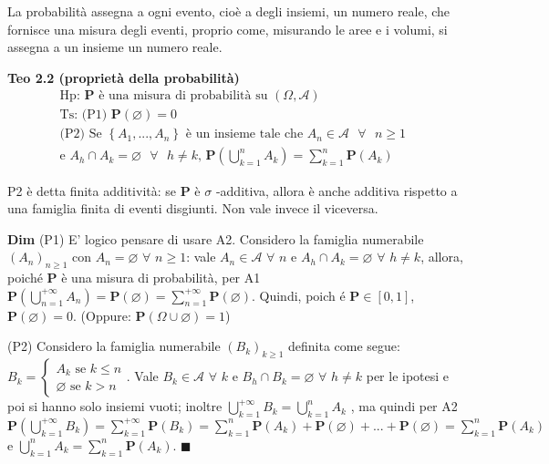 \documentclass{article}
\begin{document}
La probabilit\`{a} assegna a ogni evento, cio\`{e} a degli insiemi, un
numero reale, che fornisce una misura degli eventi, proprio come, misurando
le aree e i volumi, si assegna a un insieme un numero reale.

\textbf{Teo 2.2 (propriet\`{a} della probabilit\`{a})}%
\begin{gather*}
\text{Hp: }\mathbf{P}\text{ \`{e} una misura di probabilit\`{a} su }\left(
\Omega ,\mathcal{A}\right) \\
\text{Ts: (P1) }\mathbf{P}\left( \varnothing \right) =0 \\
\text{(P2) Se }\left\{ A_{1},...,A_{n}\right\} \text{ \`{e} un insieme tale
che }A_{n}\in \mathcal{A}\text{ }\forall \text{ }n\geq 1\text{ } \\
\text{e }A_{h}\cap A_{k}=\varnothing \text{ }\forall \text{ }h\neq k\text{, }%
\mathbf{P}\left( \bigcup_{k=1}^{n}A_{k}\right) =\sum_{k=1}^{n}\mathbf{P}%
\left( A_{k}\right)
\end{gather*}

P2 \`{e} detta finita additivit\`{a}: se $\mathbf{P}$ \`{e} $\sigma $%
-additiva, allora \`{e} anche additiva rispetto a una famiglia finita di
eventi disgiunti. Non vale invece il viceversa.

\textbf{Dim} (P1) E' logico pensare di usare A2. Considero la famiglia
numerabile $\left( A_{n}\right) _{n\geq 1}$ con $A_{n}=\varnothing $ $%
\forall $ $n\geq 1$: vale $A_{n}\in \mathcal{A}$ $\forall $ $n$ e $A_{h}\cap
A_{k}=\varnothing $ $\forall $ $h\neq k$, allora, poich\'{e} $\mathbf{P}$ 
\`{e} una misura di probabilit\`{a}, per A1 $\mathbf{P}\left(
\bigcup_{n=1}^{+\infty }A_{n}\right) =\mathbf{P}\left( \varnothing \right)
=\sum_{n=1}^{+\infty }\mathbf{P}\left( \varnothing \right) $. Quindi, poich%
\'{e} $\mathbf{P}\in \left[ 0,1\right] $, $\mathbf{P}\left( \varnothing
\right) =0$. (Oppure: $\mathbf{P}\left( \Omega \cup \varnothing \right) =1$)

(P2) Considero la famiglia numerabile $\left( B_{k}\right) _{k\geq 1}$
definita come segue: $B_{k}=\left\{ 
\begin{array}{c}
A_{k}\text{ se }k\leq n \\ 
\varnothing \text{ se }k>n%
\end{array}%
\right. $. Vale $B_{k}\in \mathcal{A}$ $\forall $ $k$ e $B_{h}\cap
B_{k}=\varnothing $ $\forall $ $h\neq k$ per le ipotesi e poi si hanno solo
insiemi vuoti; inoltre $\bigcup_{k=1}^{+\infty }B_{k}=\bigcup_{k=1}^{n}A_{k}$%
, ma quindi per A2 $\mathbf{P}\left( \bigcup_{k=1}^{+\infty }B_{k}\right)
=\sum_{k=1}^{+\infty }\mathbf{P}\left( B_{k}\right) =\sum_{k=1}^{n}\mathbf{P}%
\left( A_{k}\right) +\mathbf{P}\left( \varnothing \right) +...+\mathbf{P}%
\left( \varnothing \right) =\sum_{k=1}^{n}\mathbf{P}\left( A_{k}\right) $ e $%
\bigcup_{k=1}^{n}A_{k}=\sum_{k=1}^{n}\mathbf{P}\left( A_{k}\right) $. $%
\blacksquare $
\end{document}
